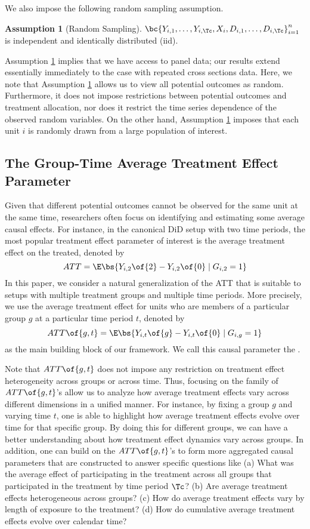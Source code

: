 \documentclass[12pt]{article}
\newcommand{\highlightB}[1]{{\emph{\color{MyBlue}{#1}}}}
\theoremstyle{definition}
\newtheorem{assumption}{Assumption}
\begin{document}
We also impose the following random sampling assumption. 

\begin{assumption}[Random Sampling] \label{RS}
    $\bc{Y_{i,1}, \ldots, Y_{i, \Tc}, X_i, D_{i,1}, \ldots, D_{i, \Tc}}_{i=1}^{n}$ is independent and identically distributed (iid).
\end{assumption}

Assumption \ref{RS} implies that we have access to panel data; our results extend essentially immediately to the case with repeated cross sections data. Here, we note that Assumption \ref{RS} allows us to view all potential outcomes as random. Furthermore, it does not impose restrictions between potential outcomes and treatment allocation, nor does it restrict the time series dependence of the observed random variables. On the other hand, Assumption \ref{RS} imposes that each unit $i$ is randomly drawn from a large population of interest.

\subsection{The Group-Time Average Treatment Effect Parameter}

Given that different potential outcomes cannot be observed for the same unit at the same time, researchers often focus on identifying and estimating some average causal effects. For instance, in the canonical DiD setup with two time periods, the most popular treatment effect parameter of interest is the average treatment effect on the treated, denoted by
$$
ATT = \E\bs{Y_{i,2}\of{2} - Y_{i,2}\of{0} \mid G_{i,2} = 1}
$$
In this paper, we consider a natural generalization of the ATT that is suitable to setups with multiple treatment groups and multiple time periods. More precisely, we use the average treatment effect for units who are members of a particular group $g$ at a particular time period $t$, denoted by 
$$
ATT\of{g, t} = \E\bs{Y_{i,t}\of{g} - Y_{i,t}\of{0} \mid G_{i,g} = 1}
$$
as the main building block of our framework. We call this causal parameter the \highlightB{group-time average treatment effect}.

Note that $ATT\of{g, t}$ does not impose any restriction on treatment effect heterogeneity across groups or across time. Thus, focusing on the family of $ATT\of{g, t}$'s allow us to analyze how average treatment effects vary across different dimensions in a unified manner. For instance, by fixing a group $g$ and varying time $t$, one is able to highlight how average treatment effects evolve over time for that specific group. By doing this for different groups, we can have a better understanding about how treatment effect dynamics vary across groups. In addition, one can build on the $ATT\of{g, t}$'s to form more aggregated causal parameters that are constructed to answer specific questions like (a) What was the average effect of participating in the treatment across all groups that participated in the treatment by time period $\Tc$? (b) Are average treatment effects heterogeneous across groups? (c) How do average treatment effects vary by length of exposure to the treatment? (d) How do cumulative average treatment effects evolve over calendar time?
\end{document}
